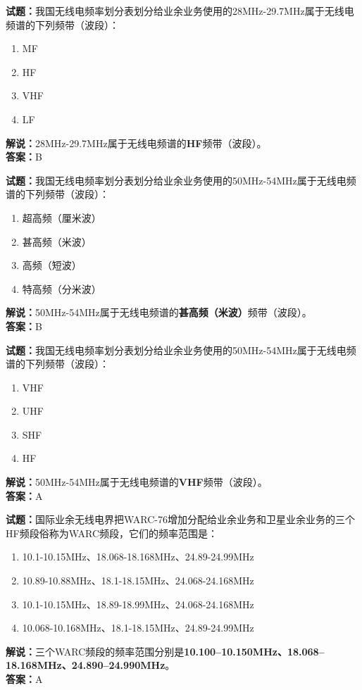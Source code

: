 \documentclass{ctexbook}
\begin{document}
\bigskip


\noindent\textbf{试题：}我国无线电频率划分表划分给业余业务使用的28MHz-29.7MHz属于无线电频谱的下列频带（波段）：
\begin{enumerate}[leftmargin=3em]
\item MF
\item HF
\item VHF
\item LF
\end{enumerate}
\noindent\textbf{解说：}28MHz-29.7MHz属于无线电频谱的\textbf{HF}频带（波段）。\\\noindent\textbf{答案：}B



\bigskip


\noindent\textbf{试题：}我国无线电频率划分表划分给业余业务使用的50MHz-54MHz属于无线电频谱的下列频带（波段）：
\begin{enumerate}[leftmargin=3em]
\item 超高频（厘米波）
\item 甚高频（米波）
\item 高频（短波）
\item 特高频（分米波）
\end{enumerate}
\noindent\textbf{解说：}50MHz-54MHz属于无线电频谱的\textbf{甚高频（米波）}频带（波段）。\\\noindent\textbf{答案：}B



\bigskip


\noindent\textbf{试题：}我国无线电频率划分表划分给业余业务使用的50MHz-54MHz属于无线电频谱的下列频带（波段）：
\begin{enumerate}[leftmargin=3em]
\item VHF
\item UHF
\item SHF
\item HF
\end{enumerate}
\noindent\textbf{解说：}50MHz-54MHz属于无线电频谱的\textbf{VHF}频带（波段）。\\\noindent\textbf{答案：}A



\bigskip


\noindent\textbf{试题：}国际业余无线电界把WARC-76增加分配给业余业务和卫星业余业务的三个HF频段俗称为WARC频段，它们的频率范围是：
\begin{enumerate}[leftmargin=3em]
\item 10.1-10.15MHz、18.068-18.168MHz、24.89-24.99MHz
\item 10.89-10.88MHz、18.1-18.15MHz、24.068-24.168MHz
\item 10.1-10.15MHz、18.89-18.99MHz、24.068-24.168MHz
\item 10.068-10.168MHz、18.1-18.15MHz、24.89-24.99MHz
\end{enumerate}
\noindent\textbf{解说：}三个WARC频段的频率范围分别是\textbf{10.100–10.150MHz、18.068–18.168MHz、24.890–24.990MHz}。\\\noindent\textbf{答案：}A
\end{document}
